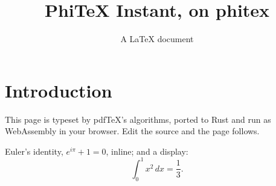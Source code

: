\documentclass{article}
\title{PhiTeX Instant, on phitex}
\author{A LaTeX document}
\begin{document}
\maketitle

\section{Introduction}
This page is typeset by pdfTeX's algorithms, ported to Rust and run as
WebAssembly in your browser. Edit the source and the page follows.

Euler's identity, $e^{i\pi} + 1 = 0$, inline; and a display:
\begin{equation}
  \int_0^1 x^2\,dx = \frac{1}{3}.
\end{equation}


\end{document}
